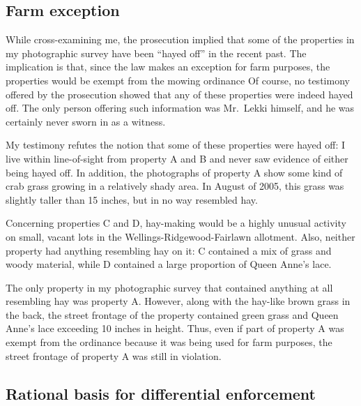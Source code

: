 \documentclass[12pt]{article}
\begin{document}


\subsection{Farm exception}
While cross-examining me, the prosecution implied that some of the properties in my photographic survey have been ``hayed off'' in the recent past.
The implication is that, since the law makes an exception for farm purposes, the properties would be exempt from the mowing ordinance 
Of course, no testimony offered by the prosecution showed that any of these properties were indeed hayed off.
The only person offering such information was Mr.\ Lekki himself, and he was certainly never sworn in as a witness.

My testimony refutes the notion that some of these properties were hayed off:  I live within line-of-sight from property A and B and never saw evidence of either being hayed off.
In addition, the photographs of property A show some kind of crab grass growing in a relatively shady area.
In August of 2005, this grass was slightly taller than 15 inches, but in no way resembled hay.

Concerning properties C and D, hay-making would be a highly unusual activity on small, vacant lots in the Wellings-Ridgewood-Fairlawn allotment. 
Also, neither property had anything resembling hay on it:  C contained a mix of grass and woody material, while D contained a large proportion of Queen Anne's lace.

The only property in my photographic survey that contained anything at all resembling hay was property A. 
However, along with the hay-like brown grass in the back, the street frontage of the property contained green grass and Queen Anne's lace exceeding 10 inches in height.
Thus, even if part of property A was exempt from the ordinance because it was being used for farm purposes, the street frontage of property A was still in violation. 

\subsection{Rational basis for differential enforcement}
\end{document}

